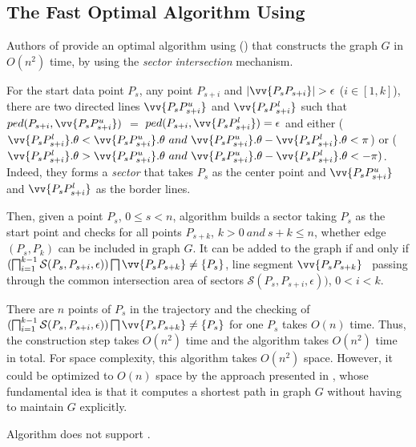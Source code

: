 \subsection{The Fast Optimal Algorithm Using \ped}
\label{subsec-optped}

Authors of \cite{Chan:Optimal} provide an optimal algorithm using \ped (\optp) that constructs the graph $G$ in $O(n^2)$ time, by using the \textit{sector intersection}\cite{Williams:Longest, Sklansky:Cone, Dunham:Cone, Zhao:Sleeve} mechanism.

For the start data point $P_s$, any point $P_{s+i}$ and $|\vv{P_sP_{s+i}}|>\epsilon$ ($i\in[1, k]$), there are two directed lines $\vv{P_sP^u_{s+i}}$ and $\vv{P_sP^l_{s+i}}$ such that $ped(P_{s+i}, \vv{P_sP^u_{s+i}})$ $=$ $ped(P_{s+i}, \vv{P_sP^l_{s+i}}) = \epsilon$ and either ($\vv{P_sP^l_{s+i}}.\theta < \vv{P_sP^u_{s+i}}.\theta ~and~\vv{P_sP^u_{s+i}}.\theta - \vv{P_sP^l_{s+i}}.\theta <\pi$) or ($\vv{P_sP^l_{s+i}}.\theta > \vv{P_sP^u_{s+i}}.\theta ~and~ \vv{P_sP^u_{s+i}}.\theta - \vv{P_sP^l_{s+i}}.\theta < -\pi)$. Indeed, they forms a \emph{sector}  that takes $P_s$ as the center point and $\vv{P_sP^u_{s+i}}$ and $\vv{P_sP^l_{s+i}}$ as the border lines. 
 

Then, given a point $P_s$, $0 \le s < n$, algorithm \optp builds a sector taking $P_s$ as the start point and checks for all points $P_{s+k}$, $k>0 ~and~ s+k \le n$, whether edge $(P_s, P_k)$ can be included in graph $G$. It can be added to the graph if and only if $(\bigsqcap_{i=1}^{k-1}\mathcal{S}(P_s, P_{s+i}, \epsilon)) \bigsqcap \vv{P_sP_{s+k}} \ne \{P_s\}$, \ie line segment $\vv{P_sP_{s+k}}$ ~passing through the common intersection area of sectors $\mathcal{S}(P_s, P_{s+i}, \epsilon))$, $0<i<k$. 

There are $n$ points of $P_s$ in the trajectory and the checking of $(\bigsqcap_{i=1}^{k-1}\mathcal{S}(P_s, P_{s+i}, \epsilon)) \bigsqcap \vv{P_sP_{s+k}} \ne \{P_s\}$ for one $P_s$ takes $O(n)$ time.
Thus, the construction step takes $O(n^2)$ time and the algorithm takes $O(n^2)$ time in total.
For space complexity, this algorithm takes $O(n^2)$ space. However, it could be optimized to $O(n)$ space by the approach presented in \cite{Chen:Space}, whose fundamental idea is that it computes a shortest path in graph $G$ without having to maintain $G$ explicitly.

Algorithm \optp does not support \sed.

